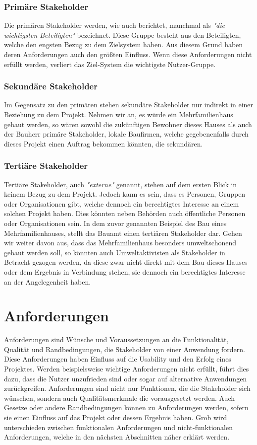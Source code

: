 \subsubsection{Primäre Stakeholder}
Die primären Stakeholder werden, wie auch \cite{FANTA1} berichtet, manchmal als \textit{"die wichtigsten Beteiligten"} bezeichnet. Diese Gruppe besteht aus den Beteiligten, welche den engsten Bezug zu dem Zielsystem haben. Aus diesem Grund haben deren Anforderungen auch den größten Einfluss. Wenn diese Anforderungen nicht erfüllt werden, verliert das Ziel-System die wichtigste Nutzer-Gruppe.

\subsubsection{Sekundäre Stakeholder}
Im Gegensatz zu den primären stehen sekundäre Stakeholder nur indirekt in einer Beziehung zu dem Projekt. Nehmen wir an, es würde ein Mehrfamilienhaus gebaut werden, so wären sowohl die zukünftigen Bewohner dieses Hauses als auch der Bauherr primäre Stakeholder, lokale Baufirmen, welche gegebenenfalls durch dieses Projekt einen Auftrag bekommen könnten, die sekundären.

\subsubsection{Tertiäre Stakeholder}
Tertiäre Stakeholder, auch \textit{"externe"} genannt, stehen auf dem ersten Blick in keinem Bezug zu dem Projekt. Jedoch kann es sein, dass es Personen, Gruppen oder Organisationen gibt, welche dennoch ein berechtigtes Interesse an einem solchen Projekt haben. Dies könnten neben Behörden auch öffentliche Personen oder Organisationen sein. In dem zuvor genannten Beispiel des Bau eines Mehrfamilienhauses, stellt das Bauamt einen tertiären Stakeholder dar. Gehen wir weiter davon aus, dass das Mehrfamilienhaus besonders umweltschonend gebaut werden soll, so könnten auch Umweltaktivisten als Stakeholder in Betracht gezogen werden, da diese zwar nicht direkt mit dem Bau dieses Hauses oder dem Ergebnis in Verbindung stehen, sie dennoch ein berechtigtes Interesse an der Angelegenheit haben.

\section{Anforderungen}
Anforderungen sind Wünsche und Voraussetzungen an die Funktionalität, Qualität und Randbedingungen, die Stakeholder von einer Anwendung fordern.
Diese Anforderungen haben Einfluss auf die Usability und den Erfolg eines Projektes. Werden beispielsweise wichtige Anforderungen nicht erfüllt, führt dies dazu, dass die Nutzer unzufrieden sind oder sogar auf alternative Anwendungen zurückgreifen. Anforderungen sind nicht nur Funktionen, die die Stakeholder sich wünschen, sondern auch Qualitätsmerkmale die vorausgesetzt werden. Auch Gesetze oder andere Randbedingungen können zu Anforderungen werden, sofern sie einen Einfluss auf das Projekt oder dessen Ergebnis haben. Grob wird unterschieden zwischen funktionalen Anforderungen und nicht-funktionalen Anforderungen, welche in den nächsten Abschnitten näher erklärt werden.

